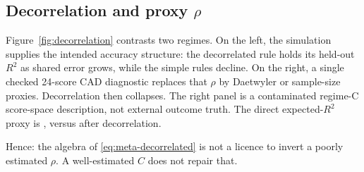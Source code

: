 \documentclass[11pt,a4paper]{article}
\newcommand{\Rtwo}{\(R^2\)}
\begin{document}
\subsection{Decorrelation and proxy \(\rho\)}
\label{sec:decorr}

Figure~\ref{fig:decorrelation} contrasts two regimes. On the
left, the simulation supplies the intended accuracy structure:
the decorrelated rule holds its held-out \Rtwo{} as shared error
grows, while the simple rules decline. On the right, a single
checked 24-score CAD diagnostic replaces that \(\rho\) by
Daetwyler or sample-size proxies. Decorrelation then collapses.
The right panel is a contaminated regime-C score-space
description, not external outcome truth. The direct
expected-\Rtwo{} proxy is \ReportRealMetaExpectedRtwo, versus
\ReportRealMetaDecorrelatedRtwo{} after decorrelation.

Hence: the algebra of \eqref{eq:meta-decorrelated} is not a
licence to invert a poorly estimated \(\rho\). A well-estimated
\(C\) does not repair that.
\end{document}

